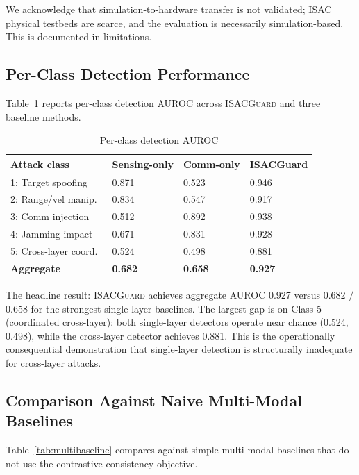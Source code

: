 \documentclass[sigconf,nonacm]{acmart}
\begin{document}
We acknowledge that simulation-to-hardware transfer is not
validated; ISAC physical testbeds are scarce, and the evaluation
is necessarily simulation-based. This is documented in
limitations.

\subsection{Per-Class Detection Performance}

Table~\ref{tab:perclass} reports per-class detection AUROC across
\textsc{ISACGuard} and three baseline methods.

\begin{table}[h]
\caption{Per-class detection AUROC}
\label{tab:perclass}
\small
\begin{tabularx}{\columnwidth}{@{}p{2.6cm}X X X@{}}
\toprule
\textbf{Attack class} & \textbf{Sensing-only} & \textbf{Comm-only} & \textbf{ISACGuard} \\
\midrule
1: Target spoofing  & 0.871 & 0.523 & 0.946 \\
2: Range/vel manip.\ & 0.834 & 0.547 & 0.917 \\
3: Comm injection   & 0.512 & 0.892 & 0.938 \\
4: Jamming impact   & 0.671 & 0.831 & 0.928 \\
5: Cross-layer coord.\ & 0.524 & 0.498 & 0.881 \\
\midrule
\textbf{Aggregate}   & \textbf{0.682} & \textbf{0.658} & \textbf{0.927} \\
\bottomrule
\end{tabularx}
\end{table}

The headline result: \textsc{ISACGuard} achieves aggregate AUROC
0.927 versus 0.682 / 0.658 for the strongest single-layer
baselines. The largest gap is on Class 5 (coordinated
cross-layer): both single-layer detectors operate near chance
(0.524, 0.498), while the cross-layer detector achieves 0.881.
This is the operationally consequential demonstration that
single-layer detection is structurally inadequate for cross-layer
attacks.

\subsection{Comparison Against Naive Multi-Modal Baselines}

Table~\ref{tab:multibaseline} compares against simple multi-modal
baselines that do not use the contrastive consistency objective.
\end{document}
